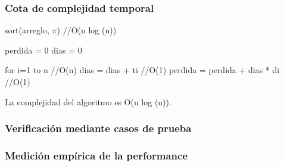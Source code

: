 \documentclass[11pt, a4paper, twoside]{article}
\begin{document}
\subsubsection{Cota de complejidad temporal}
sort(arreglo, $\pi$) //O(n log (n))

perdida = 0
dias = 0

for i=1 to n    //O(n)
    dias = dias + ti    //O(1)
    perdida = perdida + dias * di   //O(1)

La complejidad del algoritmo es O(n log (n)).


\subsubsection{Verificación mediante casos de prueba}

\subsubsection{Medición empírica de la performance}

\end{document}
